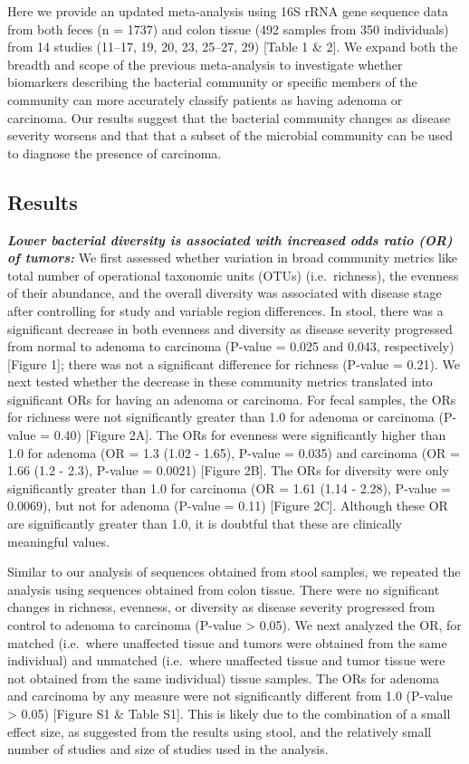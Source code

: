 \documentclass[12pt,]{article}
\begin{document}
Here we provide an updated meta-analysis using 16S rRNA gene sequence
data from both feces (n = 1737) and colon tissue (492 samples from 350
individuals) from 14 studies (11--17, 19, 20, 23, 25--27, 29) {[}Table 1
\& 2{]}. We expand both the breadth and scope of the previous
meta-analysis to investigate whether biomarkers describing the bacterial
community or specific members of the community can more accurately
classify patients as having adenoma or carcinoma. Our results suggest
that the bacterial community changes as disease severity worsens and
that that a subset of the microbial community can be used to diagnose
the presence of carcinoma.

\newpage

\subsection{Results}\label{results}

\textbf{\emph{Lower bacterial diversity is associated with increased
odds ratio (OR) of tumors:}} We first assessed whether variation in
broad community metrics like total number of operational taxonomic units
(OTUs) (i.e.~richness), the evenness of their abundance, and the overall
diversity was associated with disease stage after controlling for study
and variable region differences. In stool, there was a significant
decrease in both evenness and diversity as disease severity progressed
from normal to adenoma to carcinoma (P-value = 0.025 and 0.043,
respectively) {[}Figure 1{]}; there was not a significant difference for
richness (P-value = 0.21). We next tested whether the decrease in these
community metrics translated into significant ORs for having an adenoma
or carcinoma. For fecal samples, the ORs for richness were not
significantly greater than 1.0 for adenoma or carcinoma (P-value = 0.40)
{[}Figure 2A{]}. The ORs for evenness were significantly higher than 1.0
for adenoma (OR = 1.3 (1.02 - 1.65), P-value = 0.035) and carcinoma (OR
= 1.66 (1.2 - 2.3), P-value = 0.0021) {[}Figure 2B{]}. The ORs for
diversity were only significantly greater than 1.0 for carcinoma (OR =
1.61 (1.14 - 2.28), P-value = 0.0069), but not for adenoma (P-value =
0.11) {[}Figure 2C{]}. Although these OR are significantly greater than
1.0, it is doubtful that these are clinically meaningful values.

Similar to our analysis of sequences obtained from stool samples, we
repeated the analysis using sequences obtained from colon tissue. There
were no significant changes in richness, evenness, or diversity as
disease severity progressed from control to adenoma to carcinoma
(P-value \textgreater{} 0.05). We next analyzed the OR, for matched
(i.e.~where unaffected tissue and tumors were obtained from the same
individual) and unmatched (i.e.~where unaffected tissue and tumor tissue
were not obtained from the same individual) tissue samples. The ORs for
adenoma and carcinoma by any measure were not significantly different
from 1.0 (P-value \textgreater{} 0.05) {[}Figure S1 \& Table S1{]}. This
is likely due to the combination of a small effect size, as suggested
from the results using stool, and the relatively small number of studies
and size of studies used in the analysis.
\end{document}
